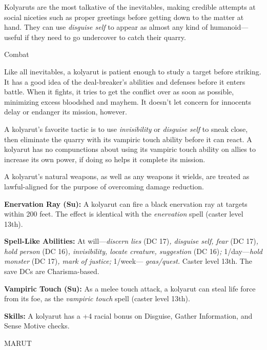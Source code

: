 \documentclass{article}
\begin{document}
Kolyaruts are the most talkative of the inevitables, making credible attempts at 
social niceties such as proper greetings before getting down to the matter at hand. 
They can use \textit{disguise self }to appear as almost any kind of humanoid---useful 
if they need to go undercover to catch their quarry.

Combat

Like all inevitables, a kolyarut is patient enough to study a target before striking. 
It has a good idea of the deal-breaker's abilities and defenses before it enters 
battle. When it fights, it tries to get the conflict over as soon as possible, 
minimizing excess bloodshed and mayhem. It doesn't let concern for innocents delay 
or endanger its mission, however.

A kolyarut's favorite tactic is to use \textit{invisibility }or \textit{disguise 
self }to sneak close, then eliminate the quarry with its vampiric touch ability 
before it can react. A kolyarut has no compunctions about using its vampiric touch 
ability on allies to increase its own power, if doing so helps it complete its 
mission.

A kolyarut's natural weapons, as well as any weapons it wields, are treated as 
lawful-aligned for the purpose of overcoming damage reduction.

\textbf{Enervation Ray (Su):} A kolyarut can fire a black enervation ray at targets 
within 200 feet. The effect is identical with the \textit{enervation }spell (caster 
level 13th).

\textbf{Spell-Like Abilities:} At will---\textit{discern lies }(DC 17)\textit{, 
disguise self, fear }(DC 17)\textit{, hold person }(DC 16)\textit{, invisibility, 
locate creature, suggestion }(DC 16)\textit{; }1/day---\textit{hold monster }(DC 
17)\textit{, mark of justice; }1/week--- \textit{geas/quest. }Caster level 13th. 
The save DCs are Charisma-based.

\textbf{Vampiric Touch (Su): }As a melee touch attack, a kolyarut can steal life 
force from its foe, as the \textit{vampiric touch }spell (caster level 13th).

\textbf{Skills: }A kolyarut has a +4 racial bonus on Disguise, Gather Information, 
and Sense Motive checks.

\vspace{12pt}
MARUT
\end{document}
